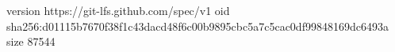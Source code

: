 version https://git-lfs.github.com/spec/v1
oid sha256:d01115b7670f38f1c43dacd48f6c00b9895cbc5a7c5cac0df99848169dc6493a
size 87544
